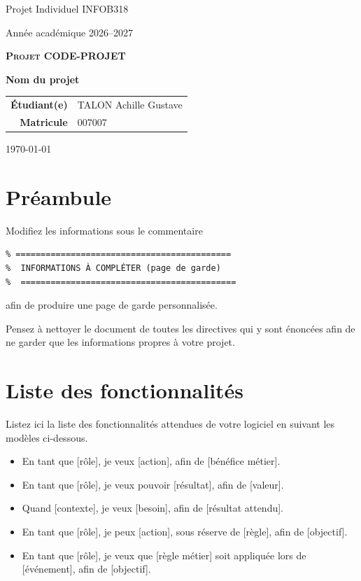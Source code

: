 \documentclass[a4paper,11pt]{article}
\newcommand{\coursnom}{Projet Individuel INFOB318}
\newcommand{\anneeacad}{2026--2027}
\newcommand{\projetcode}{CODE-PROJET}
\newcommand{\projetnom}{Nom du projet}
\newcommand{\etudiantnom}{TALON}
\newcommand{\etudiantprenoms}{Achille Gustave}
\newcommand{\matricule}{007007}
\begin{document}
\begin{titlepage}
  \centering
  \vspace*{1.5cm}
  {\large \coursnom\par}
  {\large Année académique \anneeacad\par}
  \vspace{3cm}
  {\Large\bfseries\scshape Projet \projetcode\par}
  \vspace{0.8cm}
  {\Huge\bfseries \projetnom\par}
  \vfill
  \begin{tabular}{rl}
    \textbf{Étudiant(e)} & \etudiantnom{} \etudiantprenoms \\[0.4em]
    \textbf{Matricule}   & \matricule
  \end{tabular}
  \vspace{2cm}
  \par
  {\today}
\end{titlepage}


\clearpage\newpage


\section*{Préambule}

Modifiez les informations sous le commentaire
\begin{verbatim}
% ===========================================
%  INFORMATIONS À COMPLÉTER (page de garde)
%  ===========================================
\end{verbatim}
afin de produire une page de garde personnalisée.

Pensez à nettoyer le document de toutes les directives qui y sont
énoncées afin de ne garder que les informations propres à votre
projet.

\section{Liste des fonctionnalités}
\label{sec:fonctionnalites}

Listez ici la liste des fonctionnalités attendues de votre logiciel en
suivant les modèles ci-dessous.

\begin{itemize}

\item En tant que [rôle], je veux [action], afin de [bénéfice métier].

\item En tant que [rôle], je veux pouvoir [résultat], afin de [valeur].

\item Quand [contexte], je veux [besoin], afin de [résultat attendu].

\item En tant que [rôle], je peux [action], sous réserve de [règle], afin de [objectif].

\item En tant que [rôle], je veux que [règle métier] soit appliquée lors de [événement], afin de [objectif].

\end{itemize}
\end{document}
